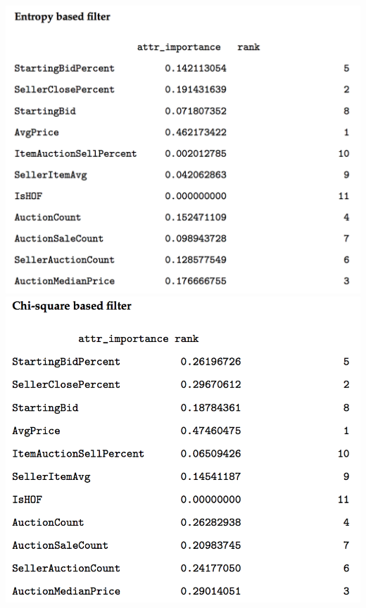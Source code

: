 \documentclass[CEJM,PDF]{cej} %
\begin{document}
\begin{center}
\includegraphics[scale=0.3]{entropy.png}\hspace*{2em}
\includegraphics[scale=0.3]{chi-square.png}\hspace*{2em}

\end{center}
\end{document}
